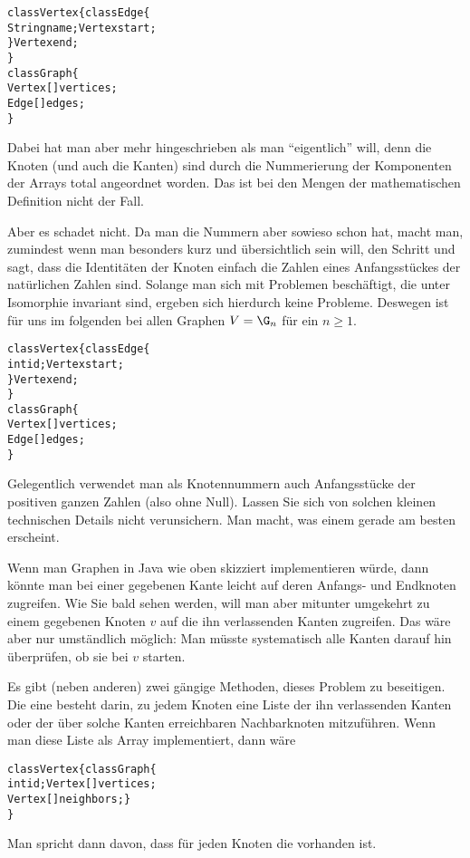 \begin{alltt}
  class Vertex \{                    class Edge \{                 
     String name;                      Vertex start;               
  \}                                    Vertex end;                 
                                    \}                            
  class Graph \{
     Vertex[] vertices;
     Edge[] edges;
  \}
\end{alltt}
% 
Dabei hat man aber mehr hingeschrieben als man "`eigentlich"' will,
denn die Knoten (und auch die Kanten) sind durch die Nummerierung der
Komponenten der Arrays total angeordnet worden. Das ist bei den Mengen
der mathematischen Definition nicht der Fall.

Aber es schadet nicht. Da man die Nummern aber sowieso schon hat,
macht man, zumindest wenn man besonders kurz und übersichtlich sein
will, den Schritt und sagt, dass die Identitäten der Knoten einfach
die Zahlen eines Anfangsstückes der natürlichen Zahlen sind.  Solange
man sich mit Problemen beschäftigt, die unter Isomorphie invariant
sind, ergeben sich hierdurch keine Probleme. Deswegen ist für uns im
folgenden bei allen Graphen $V=\G_n$ für ein $n\geq 1$.

\begin{alltt}
  class Vertex \{                    class Edge \{                 
     int id;                           Vertex start;               
  \}                                    Vertex end;                 
                                    \}                            
  class Graph \{
     Vertex[] vertices;
     Edge[] edges;
  \}                         
\end{alltt}
% 
Gelegentlich verwendet man als Knotennummern auch Anfangsstücke der
positiven ganzen Zahlen (also ohne Null). Lassen Sie sich von solchen
kleinen technischen Details nicht verunsichern. Man macht, was einem
gerade am besten erscheint.

Wenn man Graphen in Java wie oben skizziert implementieren würde, dann
könnte man bei einer gegebenen Kante leicht auf deren Anfangs- und
Endknoten zugreifen.  Wie Sie bald sehen werden, will man aber
mitunter umgekehrt zu einem gegebenen Knoten $v$ \zB auf die ihn
verlassenden Kanten zugreifen.  Das wäre aber nur umständlich möglich:
Man müsste systematisch alle Kanten darauf hin überprüfen, ob sie bei
$v$ starten.

Es gibt (neben anderen) zwei gängige Methoden, dieses Problem zu
beseitigen. Die eine besteht darin, zu jedem Knoten eine Liste der ihn
verlassenden Kanten oder der über solche Kanten erreichbaren
Nachbarknoten mitzuführen. Wenn man diese Liste als Array
implementiert, dann wäre
% 
\begin{alltt}
  class Vertex \{                       class Graph \{                 
     int id;                               Vertex[] vertices;      
     Vertex[] neighbors;               \}                         
  \}                                  
\end{alltt}
% 
Man spricht dann davon, dass für jeden Knoten die
 vorhanden ist. 

